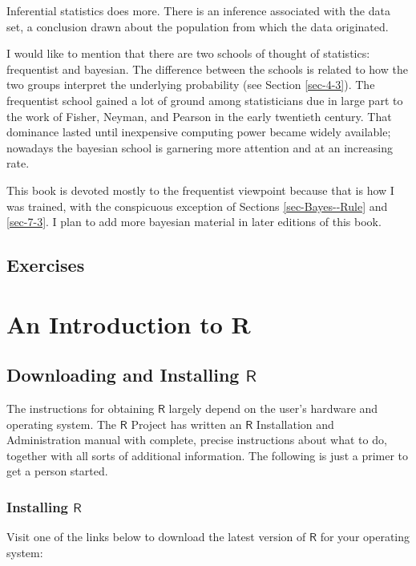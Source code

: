 \documentclass[captions=tableheading]{scrbook}
\begin{document}
Inferential statistics does more. There is an inference associated with the data set, a conclusion drawn about the population from which the data originated.

I would like to mention that there are two schools of thought of statistics: frequentist and bayesian. The difference between the schools is related to how the two groups interpret the underlying probability (see Section \ref{sec-4-3}). The frequentist school gained a lot of ground among statisticians due in large part to the work of Fisher, Neyman, and Pearson in the early twentieth century. That dominance lasted until inexpensive computing power became widely available; nowadays the bayesian school is garnering more attention and at an increasing rate.

This book is devoted mostly to the frequentist viewpoint because that is how I was trained, with the conspicuous exception of Sections \ref{sec-Bayes--Rule} and \ref{sec-7-3}. I plan to add more bayesian material in later editions of this book.

\newpage{}
\section{Exercises}
\label{sec-1-3}

\setcounter{thm}{0}
\chapter{An Introduction to R}
\label{sec-2}
\label{cha-introduction-to-R}
\section{Downloading and Installing \(\mathsf{R}\)}
\label{sec-2-1}
\label{sec-download-install-R}


The instructions for obtaining \(\mathsf{R}\) largely depend on the user's hardware and operating system. The \(\mathsf{R}\)  Project has written an \(\mathsf{R}\)  Installation and Administration manual with complete, precise instructions about what to do, together with all sorts of additional information. The following is just a primer to get a person started.
\subsection{Installing \(\mathsf{R}\)}
\label{sec-2-1-1}


Visit one of the links below to download the latest version of \(\mathsf{R}\) 
for your operating system:
\end{document}
